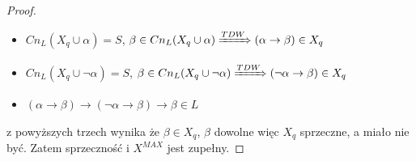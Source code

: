 \documentclass[10pt,a4paper]{article}
\theoremstyle{plain}
\theoremstyle{definition}
\begin{document}
\begin{proof}
\begin{itemize}
\item $Cn_L(X_q \cup {\alpha}) = S$, $\beta \in Cn_L(X_q \cup {\alpha}) \xRightarrow{TDW} (\alpha \rightarrow \beta) \in X_q$
\item $Cn_L(X_q \cup {\neg \alpha}) = S$, $\beta \in Cn_L(X_q \cup {\neg \alpha}) \xRightarrow{TDW} (\neg 	\alpha \rightarrow \beta) \in X_q$
\item $(\alpha \rightarrow \beta) \rightarrow (\neg \alpha \rightarrow \beta) \rightarrow \beta \in L$
\end{itemize}
z powyższych trzech wynika że $\beta \in X_q$, $\beta$ dowolne więc $X_q$ sprzeczne, a miało nie być. Zatem sprzeczność i $X^{MAX}$ jest zupełny.

\end{proof}
\end{document}

